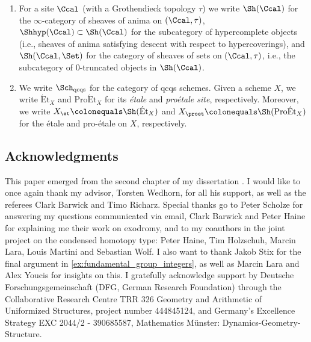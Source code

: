 \documentclass[leqno]{article}
\newcommand{\Et}[1]{\mathrm{\acute{E}t}_{#1}}
\newcommand{\ProEt}[1]{\mathrm{Pro\acute{E}t}_{#1}}
\begin{document}
\begin{enumerate}
     \item For a site $\Ccal$ (with a Grothendieck topology $\tau$) we write $\Sh(\Ccal)$ for the $\infty$-category of sheaves of anima on $(\Ccal,\tau)$, $ \Shhyp(\Ccal) \subset \Sh(\Ccal)$ for the subcategory of hypercomplete objects (i.e., sheaves of anima satisfying descent with respect to hypercoverings), and $\Sh(\Ccal, \Set)$ for the category of sheaves of sets on $(\Ccal, \tau)$, i.e., the subcategory of $0$-truncated objects in $\Sh(\Ccal)$.
    \item We write $\Sch_{\mathrm{qcqs}}$ for the category of qcqs schemes. Given a scheme $ X $, we write $\Et{X}$ and $\ProEt{X}$ for its \emph{étale} and \emph{proétale site}, respectively.
    Moreover, we write $X_{\et} \colonequals \Sh(\Et{X})$ and $X_{\proet} \colonequals \Sh(\ProEt{X})$ for the \'etale and pro-\'etale \topoi on $ X $, respectively. 
% 
\end{enumerate}


\subsection*{Acknowledgments}\label{intro_subsec:acknowledgments}

This paper emerged from the second chapter of my dissertation \cite{CatrinsThesis}.
I would like to once again thank my advisor, Torsten Wedhorn, for all his support, as well as the referees Clark Barwick and Timo Richarz.
Special thanks go to Peter Scholze for answering my questions communicated via email, Clark Barwick and Peter Haine for explaining me their work on exodromy, and to my coauthors in the joint project \cite{The_condensed_homotopy_type} on the condensed homotopy type: Peter Haine, Tim Holzschuh, Marcin Lara, Louis Martini and Sebastian Wolf.
I also want to thank Jakob Stix for the final argument in \cref{ex:fundamental_group_integers}, as well as Marcin Lara and Alex Youcis for insights on this. 
I gratefully acknowledge support by Deutsche For\-schungs\-ge\-mein\-schaft (DFG, German Research Foundation) through the Collaborative Research Centre TRR 326 Geometry and Arithmetic of Uniformized Structures, project number 444845124, and Germany's Excellence Strategy EXC 2044/2 - 390685587, Mathematics Münster: Dynamics-Geometry-Structure.
\end{document}
